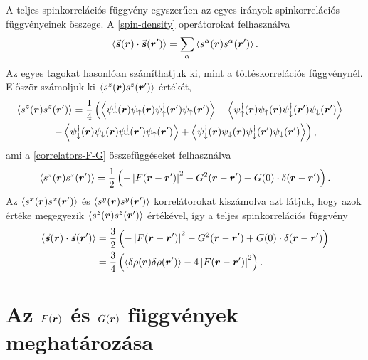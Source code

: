 \documentclass[a4paper,12pt,titlepage]{article}
\newcommand{\RR}{{\vb*{r}}}
\begin{document}
A teljes spinkorrelációs függvény egyszerűen az egyes irányok spinkorrelációs függvényeinek összege.  A \eqref{spin-density} operátorokat felhasználva
\begin{equation}
	\left< \va*{s}(\RR) \cdot \va*{s}(\RR^\prime) \right> = \sum_\alpha \left< s^\alpha(\RR) s^\alpha(\RR^\prime) \right>.
\end{equation}
Az egyes tagokat hasonlóan számíthatjuk ki, mint a töltéskorrelációs függvénynél.  Először számoljuk ki $\expval{s^z(\RR) s^z(\RR^\prime)}$ értékét,
\begin{multline}
	\expval{s^z(\RR) s^z(\RR^\prime)} = \frac{1}{4} \left( \expval{\psi_\uparrow^\dagger(\RR) \psi_\uparrow(\RR) \psi_\uparrow^\dagger(\RR^\prime) \psi_\uparrow(\RR^\prime)} - \expval{\psi_\uparrow^\dagger(\RR) \psi_\uparrow(\RR) \psi_\downarrow^\dagger(\RR^\prime) \psi_\downarrow(\RR^\prime)} -
	\right. \\ \left. -
	\expval{\psi_\downarrow^\dagger(\RR) \psi_\downarrow(\RR) \psi_\uparrow^\dagger(\RR^\prime) \psi_\uparrow(\RR^\prime)} + \expval{\psi_\downarrow^\dagger(\RR) \psi_\downarrow(\RR) \psi_\downarrow^\dagger(\RR^\prime) \psi_\downarrow(\RR^\prime)} \right),
\end{multline}
ami a \eqref{correlators-F-G} összefüggéseket felhasználva
\begin{equation}
	\expval{s^z(\RR) s^z(\RR^\prime)} = \frac{1}{2} \left( -\left| F(\RR - \RR^\prime) \right|^2 - G^2(\RR - \RR^\prime) + G(0) \cdot \delta(\RR - \RR^\prime) \right).
\end{equation}
Az $\expval{s^x(\RR) s^x(\RR^\prime)}$ és $\expval{s^y(\RR) s^y(\RR^\prime)}$ korrelátorokat kiszámolva azt látjuk, hogy azok értéke megegyezik $\expval{s^z(\RR) s^z(\RR^\prime)}$ értékével, így a teljes spinkorrelációs függvény
\begin{equation}
\begin{split} \label{spin-F-G}
	\expval{\va*{s}(\RR) \cdot \va*{s}(\RR^\prime)} & = \frac{3}{2} \left( -\left| F(\RR - \RR^\prime) \right|^2 - G^2(\RR - \RR^\prime) + G(0) \cdot \delta(\RR - \RR^\prime) \right) \\
	& = \frac{3}{4} \left( \expval{\delta\rho(\RR) \delta\rho(\RR^\prime)} - 4 \left| F(\RR - \RR^\prime) \right|^2  \right).
\end{split}
\end{equation}


\section{Az $F(\RR)$ és $G(\RR)$ függvények meghatározása}
\end{document}
